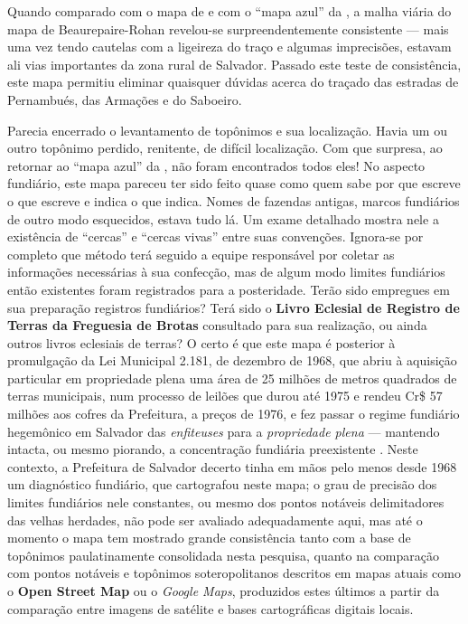 Quando comparado com o mapa de  e com o ``mapa azul'' da , a malha viária do mapa de Beaurepaire-Rohan revelou-se surpreendentemente consistente --- mais uma vez tendo cautelas com a ligeireza do traço e algumas imprecisões, estavam ali vias importantes da zona rural de Salvador. Passado este teste de consistência, este mapa permitiu eliminar quaisquer dúvidas acerca do traçado das estradas de Pernambués, das Armações e do Saboeiro.

Parecia encerrado o levantamento de topônimos e sua localização. Havia um ou outro topônimo perdido, renitente, de difícil localização. Com que surpresa, ao retornar ao ``mapa azul'' da , não foram encontrados todos eles! No aspecto fundiário, este mapa pareceu ter sido feito quase como quem sabe por que escreve o que escreve e indica o que indica. Nomes de fazendas antigas, marcos fundiários de outro modo esquecidos, estava tudo lá. Um exame detalhado mostra nele a existência de ``cercas'' e ``cercas vivas'' entre suas convenções. Ignora-se por completo que método terá seguido a equipe responsável por coletar as informações necessárias à sua confecção, mas de algum modo limites fundiários então existentes foram registrados para a posteridade. Terão sido empregues em sua preparação registros fundiários? Terá sido o \textbf{Livro Eclesial de Registro de Terras da Freguesia de Brotas} consultado para sua realização, ou ainda outros livros eclesiais de terras? O certo é que este mapa é posterior à promulgação da Lei Municipal 2.181, de dezembro de 1968, que abriu à aquisição particular em propriedade plena uma área de 25 milhões de metros quadrados de terras municipais, num processo de leilões que durou até 1975 e rendeu Cr\$ 57 milhões aos cofres da Prefeitura, a preços de 1976, e fez passar o regime fundiário hegemônico em Salvador das \textit{enfiteuses} para a \textit{propriedade plena} --- mantendo intacta, ou mesmo piorando, a concentração fundiária preexistente \cite{BRANDAO1980,SIMOES1985,VASCONCELLOS1974}. Neste contexto, a Prefeitura de Salvador decerto tinha em mãos pelo menos desde 1968 um diagnóstico fundiário, que cartografou neste mapa; o grau de precisão dos limites fundiários nele constantes, ou mesmo dos pontos notáveis delimitadores das velhas herdades, não pode ser avaliado adequadamente aqui, mas até o momento o mapa tem mostrado grande consistência tanto com a base de topônimos paulatinamente consolidada nesta pesquisa, quanto na comparação com pontos notáveis e topônimos soteropolitanos descritos em mapas atuais como o \textbf{Open Street Map} ou o \textit{Google Maps}, produzidos estes últimos a partir da comparação entre imagens de satélite e bases cartográficas digitais locais.

